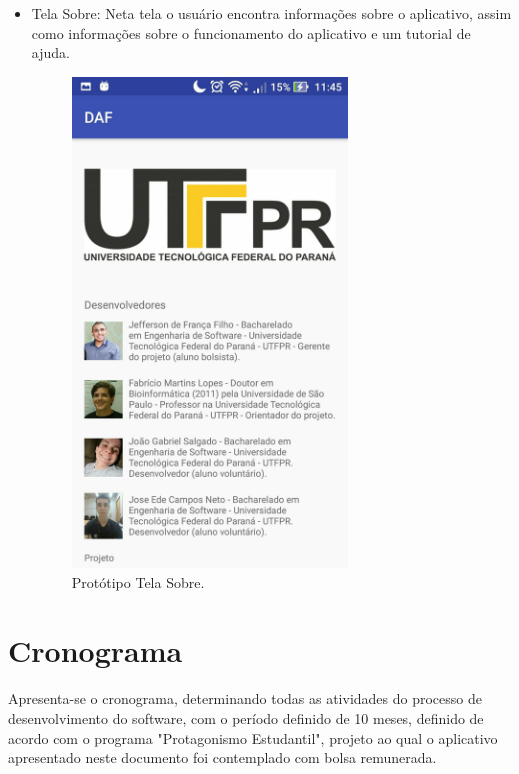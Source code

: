 \begin{itemize}
	\item  Tela Sobre: Neta tela o usu\'ario encontra informa\c{c}\~oes sobre o aplicativo, assim como informa\c{c}\~oes sobre o funcionamento do aplicativo e um tutorial de ajuda. 
	\begin{figure}[H]
		\centering
		\caption[Prot\'otipo Tela Sobre]{Prot\'otipo Tela Sobre. \label{fig:prototiposobre}}
		\includegraphics[height=13cm]{./Figuras/prototipo_sobre.jpg}%
	\end{figure}
\end{itemize}

\section{Cronograma}

Apresenta-se o cronograma, determinando todas as atividades do processo de desenvolvimento do software, com o per\'iodo definido de 10 meses, definido de acordo com o programa "Protagonismo Estudantil", projeto ao qual o aplicativo apresentado neste documento foi contemplado com bolsa remunerada. 

